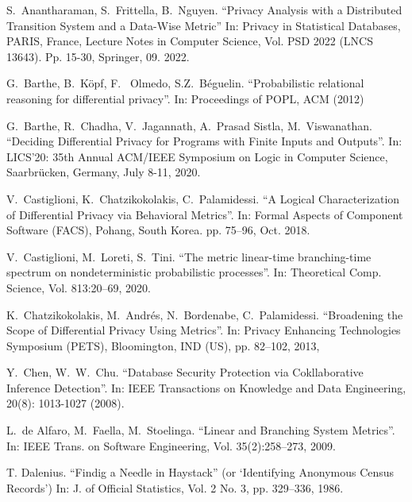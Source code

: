 \documentclass[pdflatex]{article}
\begin{document}
  \begin{thebibliography}{99}

  S.~Anantharaman, S.~Frittella, B.~Nguyen.
  \newblock ``Privacy Analysis with a Distributed Transition System and a Data-Wise Metric''
  \newblock In: Privacy in Statistical Databases,  PARIS, France, Lecture Notes in  Computer
  Science, Vol. PSD 2022 (LNCS 13643). Pp. 15-30, Springer, 09. 2022.
  
  G.~Barthe, B.~K\"{o}pf, F.~ Olmedo, S.Z.~B\'eguelin.
  \newblock ``Probabilistic relational reasoning for differential privacy''.
  \newblock In: Proceedings of POPL, ACM (2012)
 
  G.~Barthe, R.~Chadha, V.~Jagannath,  A.~Prasad Sistla, M.~Viswanathan.
  \newblock   ``Deciding Differential Privacy for Programs with Finite Inputs
                  and  Outputs''.
 \newblock In: LICS'20: 35th Annual {ACM/IEEE} Symposium on Logic in Computer
 Science, Saarbr{\"{u}}cken, Germany, July 8-11, 2020.

  V.~Castiglioni, K.~Chatzikokolakis, C.~Palamidessi.
 \newblock ``A Logical Characterization of Differential Privacy via Behavioral Metrics''.
 \newblock In: Formal Aspects of Component Software (FACS), Pohang,
 South Korea. pp. 75--96, Oct. 2018. 
 
  V.~Castiglioni, M.~Loreti, S.~Tini.
  \newblock ``The metric linear-time branching-time spectrum on
                       nondeterministic probabilistic processes''.
  \newblock  In: Theoretical Comp. Science, Vol. 813:20--69, 2020. 

  K.~Chatzikokolakis, M.~Andr\'es, N.~Bordenabe, C.~Palamidessi.
  \newblock  ``Broadening the Scope of Differential Privacy Using Metrics''.
  \newblock In: Privacy Enhancing Technologies Symposium (PETS), 
  Bloomington, IND (US), pp. 82--102, 2013,

  Y.~Chen, W.~W.~Chu.
  \newblock ``Database Security Protection via Cokllaborative Inference Detection''.
  \newblock In: IEEE Transactions on Knowledge and Data Engineering,
     20(8): 1013-1027 (2008). 
  
  L.~de Alfaro, M.~Faella, M.~Stoelinga.
  \newblock ``Linear and Branching System Metrics''. 
  \newblock In: IEEE Trans. on  Software Engineering, Vol. 35(2):258--273, 2009.

    T. Dalenius.
   \newblock  ``Findig a Needle in Haystack'' (or `Identifying Anonymous Census Records')
   \newblock In: J. of Official Statistics, Vol. 2 No. 3, pp. 329--336, 1986. 
    

\end{thebibliography}
\end{document}
